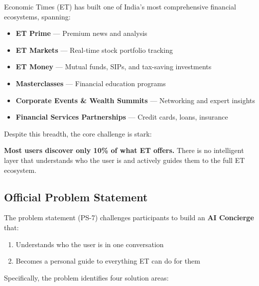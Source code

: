 \documentclass[12pt,a4paper]{article}
\begin{document}
Economic Times (ET) has built one of India's most comprehensive financial ecosystems, spanning:

\begin{itemize}[noitemsep]
  \item \textbf{ET Prime} — Premium news and analysis
  \item \textbf{ET Markets} — Real-time stock portfolio tracking
  \item \textbf{ET Money} — Mutual funds, SIPs, and tax-saving investments
  \item \textbf{Masterclasses} — Financial education programs
  \item \textbf{Corporate Events \& Wealth Summits} — Networking and expert insights
  \item \textbf{Financial Services Partnerships} — Credit cards, loans, insurance
\end{itemize}

Despite this breadth, the core challenge is stark:

\begin{highlight}
\textbf{Most users discover only 10\% of what ET offers.} There is no intelligent layer that understands who the user is and actively guides them to the full ET ecosystem.
\end{highlight}

\subsection{Official Problem Statement}

The problem statement (PS-7) challenges participants to build an \textbf{AI Concierge} that:

\begin{enumerate}[noitemsep]
  \item Understands who the user is in one conversation
  \item Becomes a personal guide to everything ET can do for them
\end{enumerate}

Specifically, the problem identifies four solution areas:
\end{document}

